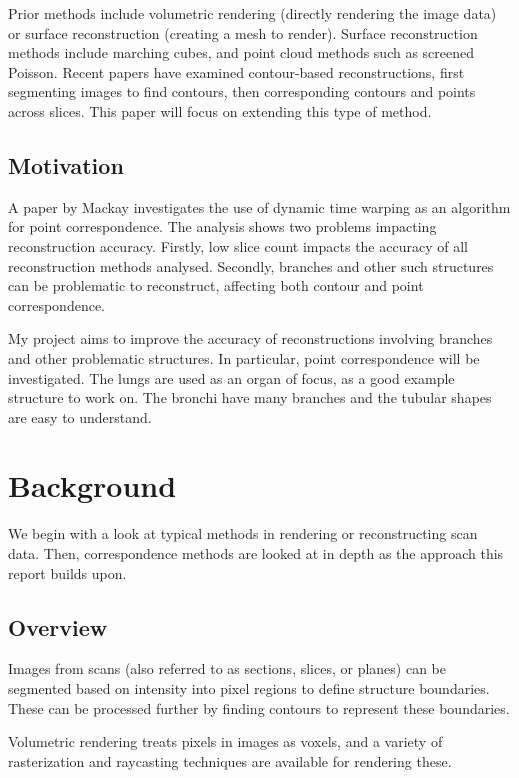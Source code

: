 \documentclass[11p, titlepage]{article}
\begin{document}
Prior methods include volumetric rendering (directly rendering the image data) or surface reconstruction (creating a mesh to render). Surface reconstruction methods include marching cubes, and point cloud methods such as screened Poisson. Recent papers \cite{mackay2019robust, mukundan2016reconstruction} have examined contour-based reconstructions, first segmenting images to find contours, then corresponding contours and points across slices. This paper will focus on extending this type of method.

\subsection{Motivation}

A paper by Mackay \cite{mackay2019robust} investigates the use of dynamic time warping as an algorithm for point correspondence. The analysis shows two problems impacting reconstruction accuracy. Firstly, low slice count impacts the accuracy of all reconstruction methods analysed. Secondly, branches and other such structures can be problematic to reconstruct, affecting both contour and point correspondence.

My project aims to improve the accuracy of reconstructions involving branches and other problematic structures. In particular, point correspondence will be investigated. The lungs are used as an organ of focus, as a good example structure to work on. The bronchi have many branches and the tubular shapes are easy to understand.
\pagebreak

\section{Background}

We begin with a look at typical methods in rendering or reconstructing scan data. Then, correspondence methods are looked at in depth as the approach this report builds upon.

\subsection{Overview}

Images from scans (also referred to as sections, slices, or planes) can be segmented based on intensity into pixel regions to define structure boundaries. These can be processed further by finding contours to represent these boundaries.

Volumetric rendering treats pixels in images as voxels, and a variety of rasterization and raycasting techniques are available for rendering these.
\end{document}
